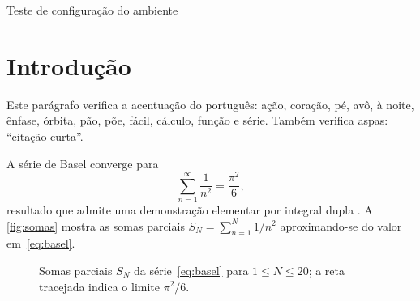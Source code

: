\documentclass[a4paper,12pt]{article}
\begin{document}
\begin{center}
  {\LARGE Teste de configuração do ambiente\par}
\end{center}

\section{Introdução}

Este parágrafo verifica a acentuação do português: ação, coração, pé, avô,
à noite, ênfase, órbita, pão, põe, fácil, cálculo, função e série.
Também verifica aspas: \enquote{citação curta}.

A série de Basel converge para
\begin{equation}\label{eq:basel}
  \sum_{n=1}^{\infty} \frac{1}{n^{2}} = \frac{\pi^{2}}{6},
\end{equation}
resultado que admite uma demonstração elementar por integral dupla
\autocite{Apostol1983proof}. A \autoref{fig:somas} mostra as somas parciais
$S_N = \sum_{n=1}^{N} 1/n^{2}$ aproximando-se do valor
em~\eqref{eq:basel}.

\begin{figure}[htbp]
  \centering
  
  \caption{Somas parciais $S_N$ da série~\eqref{eq:basel} para
    $1 \le N \le 20$; a reta tracejada indica o limite $\pi^{2}/6$.}
  \label{fig:somas}
\end{figure}

\printbibliography
\end{document}
